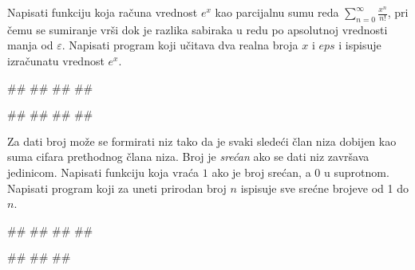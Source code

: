 \begin{Exercise}[label=v1.4_12] 
Napisati funkciju  koja
računa vrednost $e^x$ kao parcijalnu sumu reda
$\sum_{n=0}^{\infty}\frac{x^n}{n!}$, pri čemu se sumiranje vrši dok je
razlika sabiraka u redu po apsolutnoj vrednosti manja od
$\varepsilon$. Napisati program koji učitava dva realna broja $x$ i
$eps$ i ispisuje izračunatu vrednost $e^x$.

\begin{miditest}
\begin{upotreba}{1}
#\naslovInt#
##
##
##
\end{upotreba}
\end{miditest}
\begin{miditest}
\begin{upotreba}{2}
#\naslovInt#
##
##
##
\end{upotreba}
\end{miditest}
\end{Exercise}
\begin{Answer}[ref=v1.4_12]
\end{Answer}

\begin{Exercise}[label=v1.4_13] 
Za dati broj može se formirati niz tako da je svaki sledeći član niza
dobijen kao suma cifara prethodnog člana niza. Broj je \emph{srećan}
ako se dati niz završava jedinicom. Napisati funkciju  koja vraća $1$ ako je broj srećan, a $0$ u
suprotnom. Napisati program koji za uneti prirodan broj $n$ ispisuje
sve srećne brojeve od 1 do $n$. 

\begin{miditest}
\begin{upotreba}{1}
#\naslovInt#
##
##
##
\end{upotreba}
\end{miditest}
\begin{miditest}
\begin{upotreba}{2}
#\naslovInt#
##
##
\end{upotreba}
\end{miditest}

\end{Exercise}
\begin{Answer}[ref=v1.4_13]
\end{Answer}



